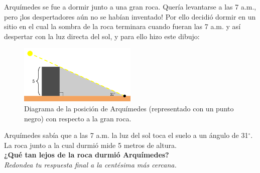 Arquímedes se fue a dormir junto a una gran roca. Quería levantarse a las 7 a.m., pero ¡los
despertadores aún no se habían inventado! Por ello decidió dormir en un sitio en el cual la sombra de
la roca terminara cuando fueran las 7 a.m. y así despertar con la luz directa del sol, y para ello hizo este dibujo:
\begin{figure}[H]
    \begin{center}
        \includegraphics[width=0.5\textwidth]{../images/arquimedes.png}
    \end{center}
    \caption{Diagrama de la posición de Arquímedes (representado con un punto negro) con respecto a la gran roca.}
    \label{fig:arquimedes}
\end{figure}
Arquímedes sabía que a las 7 a.m. la luz del sol toca el suelo a un ángulo de 31$^\circ$.
La roca junto a la cual durmió mide 5 metros de altura.\\
\textbf{¿Qué tan lejos de la roca durmió Arquímedes?}\\
\textit{Redondea tu respuesta final a la centésima más cercana.}